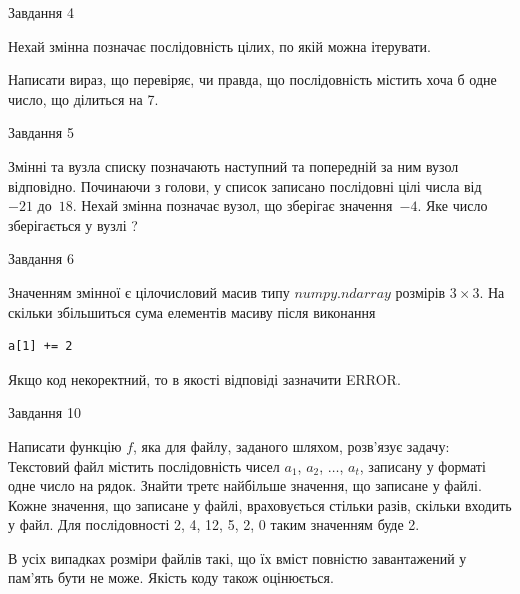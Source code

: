 \documentclass[12pt, ukrainian]{article}
\begin{document}
{               
{\begin{center}Завдання {4}\end{center}}
\vspace{-6mm}
Нехай змінна  позначає послідовність цілих, по якій можна ітерувати.

Написати вираз, що перевіряє, чи правда, що послідовність  містить хоча б одне число, що ділиться на 7.\par

\vspace{10mm}
               
{\begin{center}Завдання {5}\end{center}}
\vspace{-6mm}
Змінні  та  вузла списку позначають наступний та попередній за ним вузол відповідно. Починаючи з голови, у список записано послідовні цілі числа від~$-21$ до~$18$. Нехай змінна  позначає вузол, що зберігає значення~$-4$.
Яке число зберігається у вузлі  ?\par

               
{\begin{center}Завдання {6}\end{center}}
\vspace{-6mm}
Значенням змінної  є цілочисловий масив типу $numpy.ndarray$ розмірів $3{\times}3$. На скільки збільшиться сума елементів масиву  після виконання
\begin{verbatim}
a[1] += 2
\end{verbatim}


Якщо код некоректний, то в якості відповіді зазначити ERROR.\par

               
{\begin{center}Завдання {10}\end{center}}
\vspace{-6mm}

Написати функцію $f$, яка для файлу, заданого шляхом, розв’язує задачу:\\ Текстовий файл містить послідовність чисел $a_1$, $a_2$, $\ldots$, $a_t$, записану у форматі одне число на рядок. Знайти третє найбільше значення, що записане у файлі. Кожне значення, що записане у файлі, враховується стільки разів, скільки входить у файл. Для послідовності 2, 4, 12, 5, 2, 0 таким значенням буде 2.

В усіх випадках розміри файлів такі, що їх вміст повністю завантажений у пам'ять бути не може. Якість коду також оцінюється.



}
\end{document}
